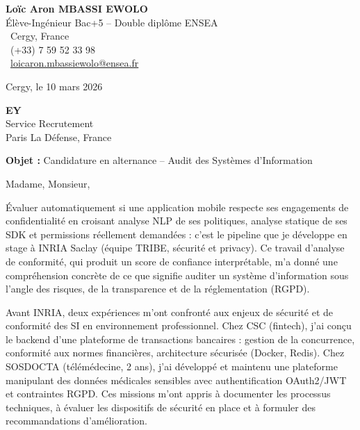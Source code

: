 \documentclass[a4paper,11pt]{article}
\begin{document}
\noindent
\begin{minipage}[t]{0.5\textwidth}
    \textbf{Loïc Aron MBASSI EWOLO}\\
    Élève-Ingénieur Bac+5 -- Double diplôme ENSEA\\[3pt]
    \faMapMarker\ Cergy, France\\
    \faPhone\ (+33) 7 59 52 33 98\\
    \faEnvelope\ \href{mailto:loicaron.mbassiewolo@ensea.fr}{loicaron.mbassiewolo@ensea.fr}
\end{minipage}
\hfill
\begin{minipage}[t]{0.4\textwidth}
    \raggedleft
    Cergy, le 10 mars 2026
\end{minipage}

\vspace{1.2cm}

\hfill
\begin{minipage}[t]{0.5\textwidth}
    \raggedleft
    \textbf{EY}\\
    Service Recrutement\\
    Paris La Défense, France
\end{minipage}

\vspace{1cm}

\noindent\textbf{Objet :} Candidature en alternance -- Audit des Systèmes d'Information

\vspace{0.8cm}

Madame, Monsieur,

Évaluer automatiquement si une application mobile respecte ses engagements de confidentialité en croisant analyse NLP de ses politiques, analyse statique de ses SDK et permissions réellement demandées : c'est le pipeline que je développe en stage à INRIA Saclay (équipe TRIBE, sécurité et privacy). Ce travail d'analyse de conformité, qui produit un score de confiance interprétable, m'a donné une compréhension concrète de ce que signifie auditer un système d'information sous l'angle des risques, de la transparence et de la réglementation (RGPD).

Avant INRIA, deux expériences m'ont confronté aux enjeux de sécurité et de conformité des SI en environnement professionnel. Chez CSC (fintech), j'ai conçu le backend d'une plateforme de transactions bancaires : gestion de la concurrence, conformité aux normes financières, architecture sécurisée (Docker, Redis). Chez SOSDOCTA (télémédecine, 2 ans), j'ai développé et maintenu une plateforme manipulant des données médicales sensibles avec authentification OAuth2/JWT et contraintes RGPD. Ces missions m'ont appris à documenter les processus techniques, à évaluer les dispositifs de sécurité en place et à formuler des recommandations d'amélioration.
\end{document}
